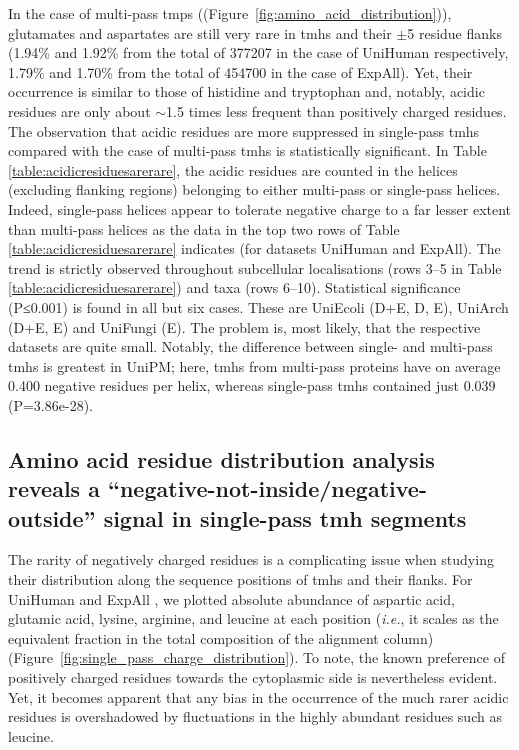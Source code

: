 In the case of multi-pass \gls{tmp}s ((Figure~\ref{fig:amino_acid_distribution})), glutamates and aspartates are still very rare in \gls{tmh}s and their $\pm$5 residue flanks (1.94\% and 1.92\% from the total of 377207 in the case of UniHuman respectively, 1.79\% and 1.70\% from the total of 454700 in the case of ExpAll).
Yet, their occurrence is similar to those of histidine and tryptophan and, notably, acidic residues are only about $\sim$1.5 times less frequent than positively charged residues.
The observation that acidic residues are more suppressed in single-pass \gls{tmh}s compared with the case of multi-pass \gls{tmh}s is statistically significant.
In Table \ref{table:acidicresiduesarerare}, the acidic residues are counted in the helices (excluding flanking regions) belonging to either multi-pass or single-pass helices.
Indeed, single-pass helices appear to tolerate negative charge to a far lesser extent than multi-pass helices as the data in the top two rows of Table \ref{table:acidicresiduesarerare} indicates (for datasets UniHuman and ExpAll).
The trend is strictly observed throughout subcellular localisations (rows 3--5 in Table \ref{table:acidicresiduesarerare}) and taxa (rows 6--10).
Statistical significance (P≤0.001) is found in all but six cases.
These are UniEcoli (D+E, D, E), UniArch (D+E, E) and UniFungi (E).
The problem is, most likely, that the respective datasets are quite small.
Notably, the difference between single- and multi-pass \gls{tmh}s is greatest in UniPM\@; here, \gls{tmh}s from multi-pass proteins have on average 0.400 negative residues per helix, whereas single-pass \gls{tmh}s contained just 0.039 (P=3.86e-28).

\subsection{Amino acid residue distribution analysis reveals a ``negative-not-inside/negative-outside'' signal in single-pass \gls{tmh} segments}

The rarity of negatively charged residues is a complicating issue when studying their distribution along the sequence positions of \gls{tmh}s and their flanks.
For UniHuman and ExpAll , we plotted absolute abundance of aspartic acid, glutamic acid, lysine, arginine, and leucine at each position (\textit{i.e.}, it scales as the equivalent fraction in the total composition of the alignment column) (Figure~\ref{fig:single_pass_charge_distribution}).
To note, the known preference of positively charged residues towards the cytoplasmic side is nevertheless evident.
Yet, it becomes apparent that any bias in the occurrence of the much rarer acidic residues is overshadowed by fluctuations in the highly abundant residues such as leucine.

